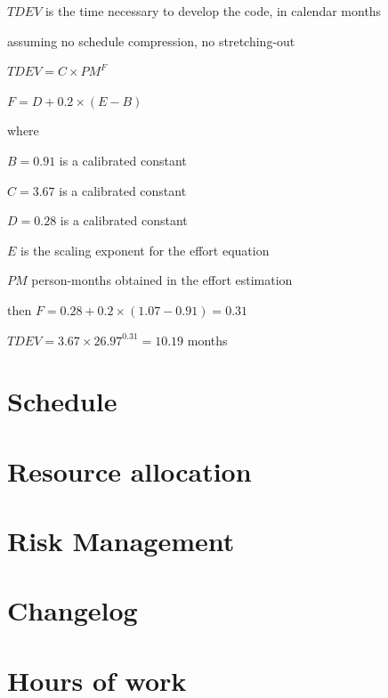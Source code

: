 \documentclass[english]{article}
\begin{document}
$TDEV$ is the time necessary to develop the code, in calendar months

assuming no schedule compression, no stretching-out

\begin{center}
	$TDEV = C \times PM^F$
\end{center}

\begin{center}
	$F = D + 0.2 \times (E-B)$
\end{center}

where

$B = 0.91$ is a calibrated constant

$C = 3.67$ is a calibrated constant

$D = 0.28$ is a calibrated constant

$E$ is the scaling exponent for the effort equation

$PM$ person-months obtained in the effort estimation


then
$F = 0.28 + 0.2 \times (1.07 - 0.91) = 0.31$

$TDEV = 3.67 \times 26.97^{0.31} = 10.19$ months

\section{Schedule}


\section{Resource allocation}


\section{Risk Management}

\appendix

\section{Changelog}

\section{Hours of work}
\end{document}
